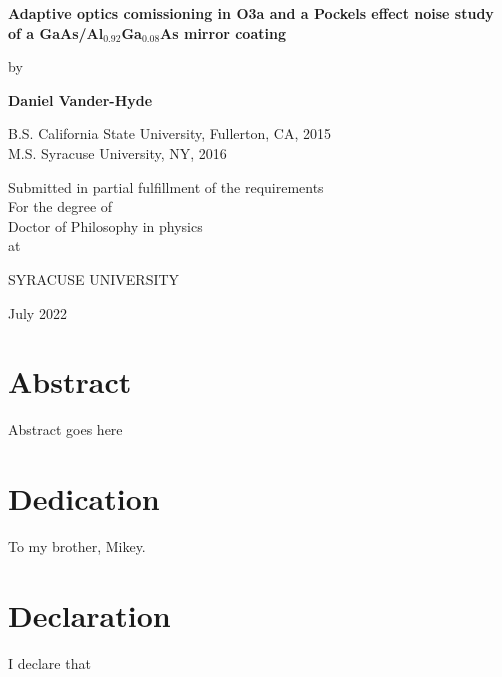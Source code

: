 \documentclass[12pt]{report}
\begin{document}
\begin{titlepage}
\begin{center}
       \vspace*{1cm}

       \textbf{\LARGE Adaptive optics comissioning in O3a and a Pockels effect noise study of a GaAs/Al$_{0.92}$Ga$_{0.08}$As mirror coating}

       \vspace{0.5cm}
       {\large by}
            
       \vspace{0.5cm}

       \textbf{\large Daniel Vander-Hyde}


       \vspace{0.5cm}
       {\large B.S. California State University, Fullerton, CA, 2015}
       \\
       {\large M.S. Syracuse University, NY, 2016}
       
       \vspace{1.0cm}
             
       {\large Submitted in partial fulfillment of the requirements\\
       For the degree of \\
       Doctor of Philosophy in physics\\
       at}

       \vspace{0.5cm}

       {\large \uppercase{Syracuse University}}
       \vfill
     
       July 2022
            
   \end{center}
\end{titlepage}

\chapter*{Abstract}
Abstract goes here

\chapter*{Dedication}
To my brother, Mikey.

\chapter*{Declaration}
I declare that
\end{document}
